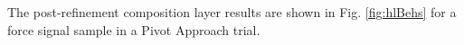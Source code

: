 The post-refinement composition layer results are shown in Fig. \ref{fig:hlBehs} for a force signal sample in a Pivot Approach trial.
